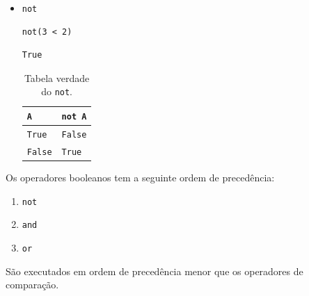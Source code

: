 \begin{itemize}
\item \lstinline+not+ 

\begin{lstlisting}[xrightmargin=2.5em]
not(3 < 2)
\end{lstlisting}

\begin{verbatim}
True
\end{verbatim}

  \begin{table}[H]
    \centering
    \caption{Tabela verdade do \lstinline+not+.}
    \begin{tabular}{l|l}
      {\texttt{A}}     & {\lstinline+not A+} \\\hline
      {\texttt{True}}  & {\texttt{False}} \\
      {\texttt{False}} & {\texttt{True}} \\\hline
    \end{tabular}
  \end{table}  
\end{itemize}

\begin{obs}
  Os operadores booleanos tem a seguinte ordem de precedência:
  \begin{enumerate}[1.]
  \item \lstinline+not+
  \item \lstinline+and+
  \item \lstinline+or+
  \end{enumerate}
  São executados em ordem de precedência menor que os operadores de comparação.
\end{obs}

